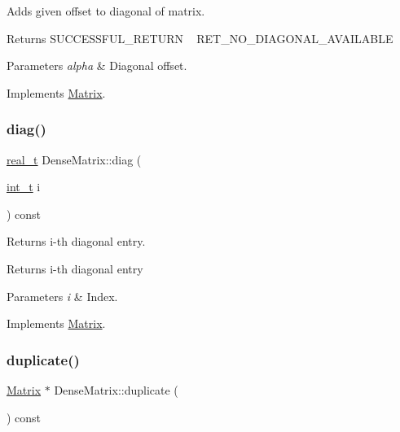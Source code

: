 Adds given offset to diagonal of matrix. \begin{DoxyReturn}{Returns}
S\+U\+C\+C\+E\+S\+S\+F\+U\+L\+\_\+\+R\+E\+T\+U\+RN ~\newline
 R\+E\+T\+\_\+\+N\+O\+\_\+\+D\+I\+A\+G\+O\+N\+A\+L\+\_\+\+A\+V\+A\+I\+L\+A\+B\+LE 
\end{DoxyReturn}

\begin{DoxyParams}{Parameters}
{\em alpha} & Diagonal offset. \\
\hline
\end{DoxyParams}


Implements \hyperlink{class_matrix_a7ee8d1b4ef0d5d5fb34342ea1889382f}{Matrix}.

\mbox{\label{class_dense_matrix_a16eea4106ac1875461f2e9fb4a8204f5}} 
\subsubsection{\texorpdfstring{diag()}{diag()}}
{\footnotesize\ttfamily \hyperlink{qp_o_a_s_e_s__wrapper_8h_a0d00e2b3dfadee81331bbb39068570c4}{real\+\_\+t} Dense\+Matrix\+::diag (\begin{DoxyParamCaption}\item[{\hyperlink{_types_8hpp_ab6fd6105e64ed14a0c9281326f05e623}{int\+\_\+t}}]{i }\end{DoxyParamCaption}) const\hspace{0.3cm}{\ttfamily [virtual]}}

Returns i-\/th diagonal entry. \begin{DoxyReturn}{Returns}
i-\/th diagonal entry 
\end{DoxyReturn}

\begin{DoxyParams}{Parameters}
{\em i} & Index. \\
\hline
\end{DoxyParams}


Implements \hyperlink{class_matrix_a8d76d428884fdb7a3deade8cad3c4b0a}{Matrix}.

\mbox{\label{class_dense_matrix_ac3f9cdc908b1f74c1dac8c14d0a09e7e}} 
\subsubsection{\texorpdfstring{duplicate()}{duplicate()}}
{\footnotesize\ttfamily \hyperlink{class_matrix}{Matrix} $\ast$ Dense\+Matrix\+::duplicate (\begin{DoxyParamCaption}{ }\end{DoxyParamCaption}) const\hspace{0.3cm}{\ttfamily [virtual]}}

